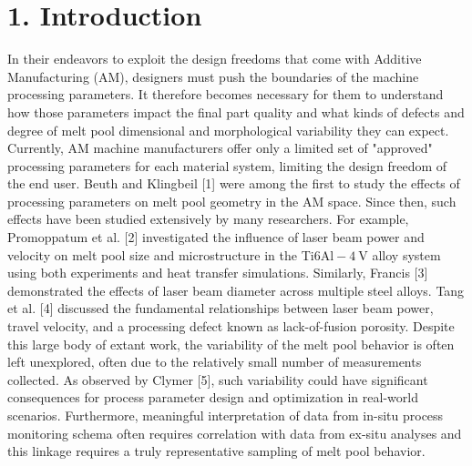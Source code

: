 \documentclass[10pt]{article}
\begin{document}
\section*{1. Introduction}
In their endeavors to exploit the design freedoms that come with Additive Manufacturing (AM), designers must push the boundaries of the machine processing parameters. It therefore becomes necessary for them to understand how those parameters impact the final part quality and what kinds of defects and degree of melt pool dimensional and morphological variability they can expect. Currently, AM machine manufacturers offer only a limited set of "approved" processing parameters for each material system, limiting the design freedom of the end user. Beuth and Klingbeil [1] were among the first to study the effects of processing parameters on melt pool geometry in the AM space. Since then, such effects have been studied extensively by many researchers. For example, Promoppatum et al. [2] investigated the influence of laser beam power and velocity on melt pool size and microstructure in the Ti$6 \mathrm{Al}-4 \mathrm{~V}$ alloy system using both experiments and heat transfer simulations. Similarly, Francis [3] demonstrated the effects of laser beam diameter across multiple steel alloys. Tang et al. [4] discussed the fundamental relationships between laser beam power, travel velocity, and a processing defect known as lack-of-fusion porosity. Despite this large body of extant work, the variability of the melt pool behavior is often left unexplored, often due to the relatively small number of measurements collected. As observed by Clymer [5], such variability could have significant consequences for process parameter design and optimization in real-world scenarios. Furthermore, meaningful interpretation of data from in-situ process monitoring schema often requires correlation with data from ex-situ analyses and this linkage requires a truly representative sampling of melt pool behavior.
\end{document}
